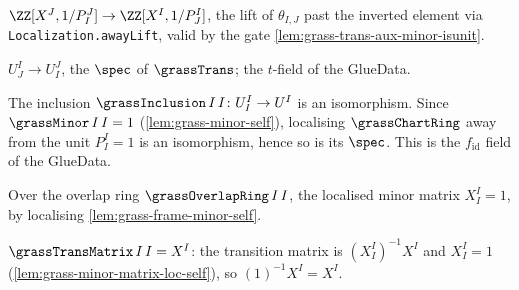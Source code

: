 \begin{definition}
  \label{def:grass-trans}
  $\ZZ[X^J,1/P^J_I]\to\ZZ[X^I,1/P^I_J]$, the lift of $\theta_{I,J}$ past the
  inverted element via \texttt{Localization.awayLift}, valid by the gate
  \cref{lem:grass-trans-aux-minor-isunit}.
\end{definition}

\begin{definition}
  \label{def:grass-trans-morphism}
  $U^I_J\to U^J_I$, the $\spec$ of $\grassTrans$; the $t$-field of the GlueData.
\end{definition}

\begin{lemma}

  \label{lem:grass-inclusion-self-isiso}
  The inclusion $\grassInclusion\,I\,I\colon U^I_I\to U^I$ is an isomorphism.
  Since $\grassMinor\,I\,I = 1$ (\cref{lem:grass-minor-self}), localising
  $\grassChartRing$ away from the unit $P^I_I = 1$ is an isomorphism, hence so is
  its $\spec$. This is the $f_{\mathrm{id}}$ field of the GlueData.
\end{lemma}

\begin{lemma}

  \label{lem:grass-minor-matrix-loc-self}
  Over the overlap ring $\grassOverlapRing\,I\,I$, the localised minor matrix
  $X^I_I = 1$, by localising \cref{lem:grass-frame-minor-self}.
\end{lemma}

\begin{lemma}

  \label{lem:grass-trans-matrix-self}
  $\grassTransMatrix\,I\,I = X^I$: the transition matrix is $(X^I_I)^{-1}X^I$ and
  $X^I_I = 1$ (\cref{lem:grass-minor-matrix-loc-self}), so $(1)^{-1}X^I = X^I$.
\end{lemma}

